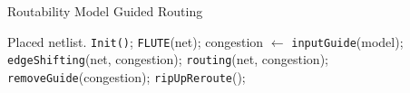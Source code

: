\begin{algorithm}
    \caption{Routability Model Guided Routing}
    \label{alg:route}
    \begin{algorithmic}[1]
        \Require Placed netlist.
        \State \texttt{Init()};
            \State \texttt{FLUTE}(net); \label{alg:ln:flute}
            \State congestion $\gets$ \texttt{inputGuide}(model); \label{alg:ln:cong}
            \State \texttt{edgeShifting}(net, congestion); \label{alg:ln:es}
            \State \texttt{routing}(net, congestion); \label{alg:ln:routing}
            \State \texttt{removeGuide}(congestion); \label{alg:ln:rmcong}
                \State \texttt{ripUpReroute}(); \label{alg:ln:rrr}
            \EndWhile
        \EndWhile
    \end{algorithmic}
\end{algorithm}

    
  

